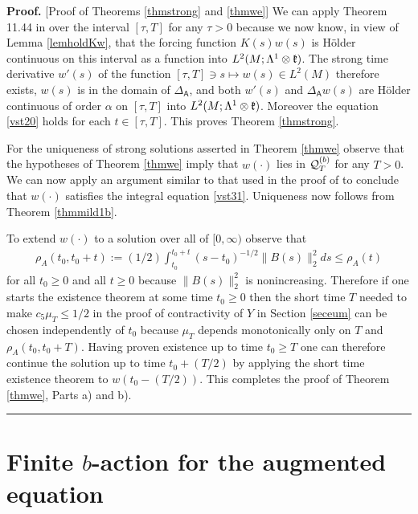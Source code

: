 \documentclass[12pt]{article}
\newenvironment{proof}[1][Proof]{\textbf{#1.} }{\ \rule{0.5em}{0.5em}}
\def \L{\Lambda}
\def \As{\mathsf{A}}
\def \Q{{\cal Q}}
\def \kf{\frak k}
\def \eref{\eqref}
\numberwithin{equation}{section}
\begin{document}
 
\bigskip
\noindent  
  \begin{proof} [Proof of Theorems \ref{thmstrong} and \ref{thmwe}] 
  We can apply Theorem 11.44 in \cite{RR} over the interval $[\tau,T]$ for
   any $\tau >0$   because we now know, in view of Lemma \ref{lemholdKw},
    that the forcing function $K(s)w(s)$ is H\"older continuous on this interval
     as a function into $L^{2}(M;\L^1\otimes \kf)$. 
     The strong time derivative $w'(s)$ of the function $[\tau,T] \ni s \mapsto w(s) \in L^2(M)$ therefore exists,
     $w(s)$ is in the domain of $\Delta_\As$, and both $w'(s)$ and $\Delta_\As w(s)$ are H\"older continuous
     of order $\alpha$ on $[\tau, T]$ into $L^2(M;\L^1\otimes \kf)$. 
  Moreover the equation \eref{vst20}    holds for each   $t \in [\tau,T]$. 
       This proves Theorem \ref{thmstrong}.
       
       For the uniqueness of strong solutions asserted in Theorem \ref{thmwe} observe that the hypotheses of  Theorem \ref{thmwe} imply 
       that $w(\cdot)$ lies in $\Q_T^{(b)}$ for any $T>0$. We can now apply
       an argument similar to that used in the proof of \cite[Theorem 3.30]{G70} to conclude
       that $w(\cdot)$ satisfies the integral equation \eref{vst31}.
       Uniqueness now follows from Theorem \ref{thmmild1b}.
       
       To extend $w(\cdot)$ to a solution over all of $[0, \infty)$ observe that
       \begin{align}
      \rho_A(t_0, t_0 +t) := (1/2) \int_{t_0}^{t_0 + t} (s-t_0)^{-1/2} \| B(s)\|_2^2 ds \le \rho_A(t)
       \end{align}
        for all $t_0 \ge 0$ and all $t \ge 0$ because $\|B(s)\|_2^2$ is nonincreasing. Therefore if one starts 
        the existence theorem at some time $t_0 \ge 0$ then the short time $T$ needed to make
        $c_5 \mu_T \le 1/2$ in the proof of contractivity of $Y$ in Section \ref{seceum} can be chosen
        independently of $t_0$ because $\mu_T$ depends monotonically only on $T$ and $\rho_A(t_0, t_0+T)$.
        Having proven existence up to  time $t_0 \ge T$ one can therefore continue the solution 
        up to time $t_0 +(T/2)$ by applying the short time existence theorem to $w(t_0 -(T/2))$. 
        This completes the proof of Theorem \ref{thmwe}, Parts a) and b).
  \end{proof}




\section{Finite $b$-action for the augmented equation}   \label{secboa} 
\end{document}
